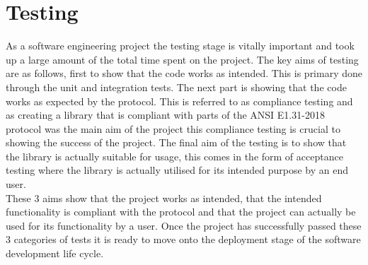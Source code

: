 \documentclass[11pt,a4paper]{article}
\begin{document}
\section{Testing}
As a software engineering project the testing stage is vitally important and took up a large amount of the total time spent on the project. The key aims of testing are as follows, first to show that the code works as intended. This is primary done through the unit and integration tests. The next part is showing that the code works as expected by the protocol. This is referred to as compliance testing and as creating a library that is compliant with parts of the ANSI E1.31-2018 protocol was the main aim of the project this compliance testing is crucial to showing the success of the project. The final aim of the testing is to show that the library is actually suitable for usage, this comes in the form of acceptance testing where the library is actually utilised for its intended purpose by an end user.\\

These 3 aims show that the project works as intended, that the intended functionality is compliant with the protocol and that the project can actually be used for its functionality by a user. Once the project has successfully passed these 3 categories of tests it is ready to move onto the deployment stage of the software development life cycle.
\end{document}
